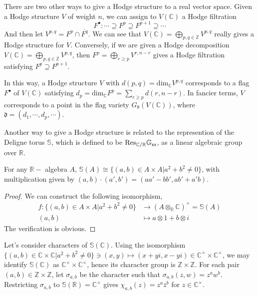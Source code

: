 There are two other ways to give a Hodge structure to a real vector space. Given a Hodge structure $V$ of weight $n$, we can assign to $V(\mathbb  C)$ a Hodge filtration 
$$
F^ \bullet : \cdots \supseteq F^p \supseteq F^{p+1} \supseteq \cdots
$$
And then let $V^{p,q}=F^p \cap \overline{F^q}$. We can see that $V(\mathbb C)= \bigoplus_{p,q\in \mathbb Z} V^{p,q}$ really gives a Hodge structure for $V$. Conversely, if we are given a Hodge decomposition $V(\mathbb C)= \bigoplus_{p,q\in \mathbb Z} V^{p,q}$, then $F^p =\bigoplus _{r \geq p} V^{r,n-r}$ gives a Hodge filtration satisfying $F^p \supseteq F^{p+1}$.

In this way, a Hodge structure $V$ with $d(p,q)= \text{dim}_\mathbb C V^{p,q}$ corresponds to a flag $F^\bullet$ of $V(\mathbb C)$ satisfying $d_p=\text{dim}_\mathbb C F^p= \sum_{r \ge p} d(r,n-r)$.  In fancier terms, $V$ corresponds to a point in the flag variety $G_ \mathfrak d(V(\mathbb C)) $, where $\mathfrak d= (d_1,\cdots,d_p,\cdots)$.

Another way to give a Hodge structure is related to the represention of the Deligne torus $\mathbb S$, which is defined to be $\rm Res_{\mathbb C/ \mathbb R} \mathbb G_m$, as a linear algebraic group over $\mathbb R$.

\begin{proposition}
 \label{proposition-Deligne-torus}
  For any $\mathbb R-$ algebra $A$, $\mathbb S(A)\cong \{(a,b)\in A \times A| a^2+b^2 \ne 0\} $, with multiplication given by $(a,b)\cdot (a',b')=(aa'-bb',ab'+a'b)$.
\end{proposition} 

\begin{proof}
We can construct the following isomorphism, 
$$
\begin{align*}
f:\{(a,b)\in A \times A| a^2+b^2 \ne 0\} &\to (A \otimes _\mathbb R \mathbb C)^ \times=\mathbb S(A) \\
(a,b) &\mapsto a \otimes 1+b\otimes i
\end{align*}
$$
The verification is obvious.
\end{proof}

Let's consider characters of $\mathbb S(\mathbb C)$. Using the isomorphism $ \{(a,b)\in \mathbb C \times \mathbb C|a^2+b^2 \ne0\} \ni (x,y) \mapsto (x+yi,x-yi) \in \mathbb C ^\times \times \mathbb C ^\times $, we may identify $\mathbb S(\mathbb C)$ as $\mathbb C ^\times \times \mathbb C ^\times $, hence its character group is $\mathbb Z \times \mathbb Z$. For each pair $(a,b)\in \mathbb Z \times \mathbb Z$, let $\sigma_{a,b}$ be the character such that $\sigma_{a,b}(z,w)=z^aw^b$. Restricting $\sigma_{a,b}$ to $\mathbb S(\mathbb R)=\mathbb C^\times$ gives $\chi_{a,b}(z)=z^a\bar z^b$ for $z\in \mathbb C^ \times$.

